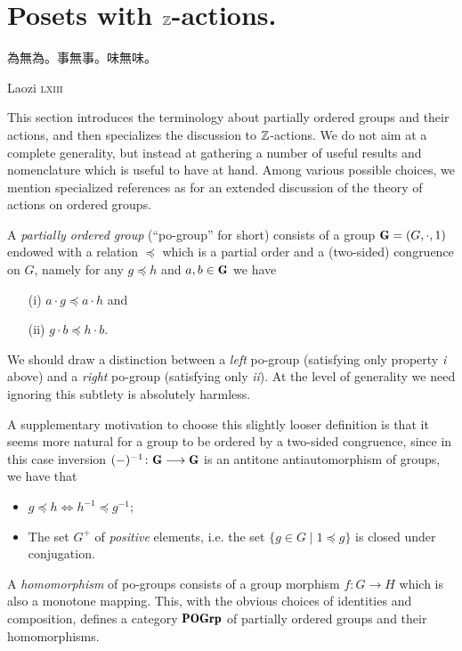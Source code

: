 \section{Posets with \texorpdfstring{$\mathbb{Z}$}{Z}-actions.}
\epigraph{\begin{CJK*}{UTF8}{bsmi} 為無為。事無事。味無味。\end{CJK*}}{Laozi \textsc{lxiii}}
This section introduces the terminology about partially ordered groups and their actions, and then specializes the discussion to $\mathbb{Z}$-actions. We do not aim at a complete generality, but instead at gathering a number of useful results and nomenclature which is useful to have at hand. Among various possible choices, we mention specialized references as \cite{blyth2005lattices, glass1999partially, Fuch63} for an extended discussion of the theory of actions on ordered groups.
\begin{definition}
A \emph{partially ordered group} (``po-group'' for short) consists of a group $\cate{G} = (G, \cdot,1)$ endowed with a relation $\preceq$ which is a partial order and a (two-sided) congruence on $G$, namely for any $g\preceq h$ and $a,b\in \cate{G}$ we have 
\begin{itemize}
\item[(i)] $a\cdot g\preceq a\cdot h$ and
\item[(ii)] $g\cdot b\preceq h\cdot b$.
\end{itemize}
\end{definition}
\begin{remark}
We should draw a distinction between a \emph{left} po-group (satisfying only property \emph{i} above) and a \emph{right} po-group (satisfying only \emph{ii}). At the level of generality we need ignoring this subtlety is absolutely harmless.

A supplementary motivation to choose this slightly looser definition is that it seems more natural for a group to be ordered by a two-sided congruence, since in this case inversion $(-)^{-1}\colon \cate{G} \to \cate{G}$ is an antitone antiautomorphism of groups, \ie we have that
\begin{itemize}
\item $g\preceq h \iff h^{-1}\preceq g^{-1}$;
\item The set $G^+$ of \emph{positive} elements, i.e. the set $\{g\in G\mid 1\preceq g\}$ is closed under conjugation.
\end{itemize}
\end{remark}
\begin{definition}
A \emph{homomorphism} of po-groups consists of a group morphism $f\colon G\to H$ which is also a monotone mapping. This, with the obvious choices of identities and composition, defines a category $\cate{POGrp}$ of partially ordered groups and their homomorphisms.
\end{definition}
